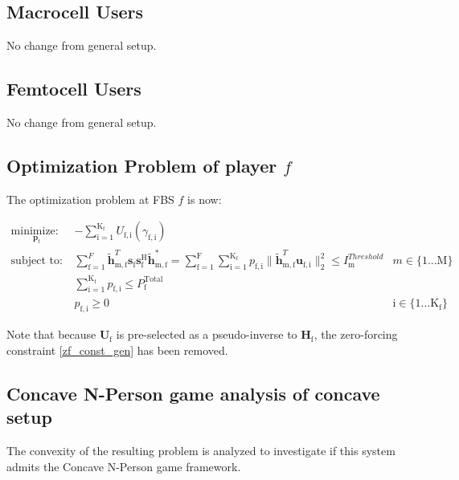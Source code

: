 \documentclass[12pt,a4paper]{report}
\begin{document}
\subsection{Macrocell Users}
No change from general setup.

\subsection{Femtocell Users}
No change from general setup.



\subsection{Optimization Problem of player $f$}\label{conproblem}
The optimization problem at FBS $f$ is now:

	\begin{subequations}
	\label{optim}
	\begin{align}
	    \underset{\mathbf{p}_{\mathrm{f}} }{\text{minimize: }} \;
	    & - \sum_{\mathrm{i=1}}^{\mathrm{K_f}}
    	U_{\mathrm{f,i}}(\gamma_{\mathrm{f,i}}) \label{player_opt_c} \\
	    \text{subject to: } \; &
	  \sum^F_{\text{f}=1} \mathbf{\tilde{h}}_{\mathrm{m,f}}^T  \mathbf{s}_{\mathrm{f}} 						
	\mathbf{s_{\mathrm{f}}^{\mathrm{H}}} \mathbf{\tilde{h}_{\mathrm{m,f}}^*} 
	=
	\sum_{\mathrm{f=1}}^{\mathrm{F}}	\sum_{\mathrm{i=1}}^{\mathrm{K_f}}
	p_{\mathrm{f,i}}\|\tilde{\mathbf{h}}_{\mathrm{m,f}}^T \mathbf{u}_{\mathrm{f,i}}\|^2_2
	\leq I^{Threshold}		
	_{\mathrm{m}} & m \in \{1 ...\text{M}\} 
		\label{interference_const_c}\\
        & 
        	\sum_{\mathrm{i=1}}^{\mathrm{K_{\mathrm{f}}}} p_{\mathrm{f,i}}
	   \leq P_{\mathrm{f}}^{\text{Total}}  \label{power_const_c}\\
        & p_{\mathrm{f,i}} \geq 0 &  \text{i} \in \{1 ...\text{K}_{\mathrm{f}}\} \label{pos_power_const_c}
	\end{align}
	\end{subequations}

Note that because $\mathbf{U}_{\mathrm{f}}$ is pre-selected as a pseudo-inverse to  $\mathbf{H_\mathrm{f}}$, the zero-forcing constraint \eqref{zf_const_gen} has been removed.

\subsection{Concave N-Person game analysis of concave setup}
The convexity of the resulting problem is analyzed to investigate if this system admits the Concave N-Person game framework. 
\end{document}
